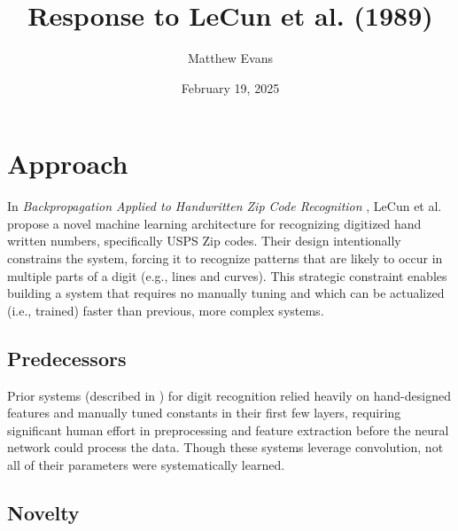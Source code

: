 \documentclass[10pt]{article}
\title{
    Response to LeCun et al. (1989) \\
}
\author{Matthew Evans}
\date{February 19, 2025}
\begin{document}
\maketitle

\section*{Approach}
In \textit{Backpropagation Applied to Handwritten Zip Code Recognition} \cite{lecun1998gradient}, LeCun et al. propose a novel machine learning architecture for recognizing digitized hand written numbers, specifically USPS Zip codes. Their design intentionally constrains the system, forcing it to recognize patterns that are likely to occur in multiple parts of a digit (e.g., lines and curves). This strategic constraint enables building a system that requires no manually tuning and which can be actualized (i.e., trained) faster than previous, more complex systems.

\subsection*{Predecessors}

Prior systems (described in \cite{Denker1989}) for digit recognition relied heavily on hand-designed features and manually tuned constants in their first few layers, requiring significant human effort in preprocessing and feature extraction before the neural network could process the data. Though these systems leverage convolution, not all of their parameters were systematically learned.





\subsection*{Novelty}
\end{document}
